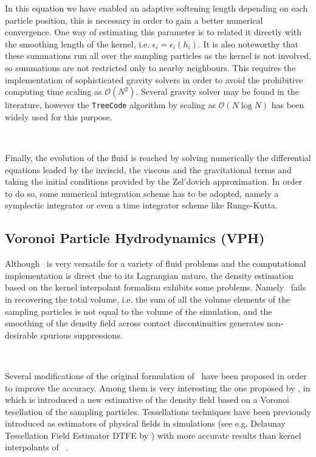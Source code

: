 \documentclass[a4,useAMS,usenatbib,usegraphicx,12pt]{article}
\begin{document}
In this equation we have enabled an adaptive softening length depending on each 
particle position, this is necessary in order to gain a better numerical 
convergence. One way of estimating this parameter is to related it directly with
the smoothing length of the kernel, i.e. $\epsilon_i = \epsilon_i(h_i)$. It is 
also noteworthy that these summations run all over the sampling particles as the 
kernel is not involved, so summations are not restricted only to nearby neighbours. 
This requires the implementation of sophisticated gravity solvers in order to 
avoid the prohibitive computing time scaling as $\mathcal{O}(N^2)$. Several 
gravity solver may be found in the literature, however the \texttt{TreeCode} 
algorithm by \citet{barnes1986} scaling as $\mathcal{O}(N\log N)$ has been widely 
used for this purpose.

\

Finally, the evolution of the fluid is reached by solving numerically the 
differential equations leaded by the inviscid, the viscous and the gravitational 
terms and taking the initial conditions provided by the Zel'dovich approximation. 
In order to do so, some numerical integration scheme has to be adopted, namely a 
symplectic integrator or even a time integrator scheme like Runge-Kutta.


\subsection*{Voronoi Particle Hydrodynamics (VPH)}

Although \SPH\ is very versatile for a variety of fluid problems and the
computational implementation is direct due to its Lagrangian nature, the density
estimation based on the kernel interpolant formalism exhibits some problems. 
Namely \SPH\ fails in recovering the total volume, i.e. the sum of all the 
volume elements of the sampling particles is not equal to the volume of the
simulation, and the smoothing of the density field across contact discontinuities
generates non-desirable spurious suppressions.

\

Several modifications of the original formulation of \SPH\ have been proposed in
order to improve the accuracy. Among them is very interesting the one proposed 
by \citet{Hess10}, in which is introduced a new estimative of the density field 
based on a Voronoi tesellation of the sampling particles. Tessellations 
techniques have been previously introduced as estimators of physical fields in
simulations (see e.g. Delaunay Tessellation Field Estimator DTFE by 
\citet{Schaap00}) with more accurate results than kernel interpolants of \SPH\
\citep{Pelupessy03}.
\end{document}
